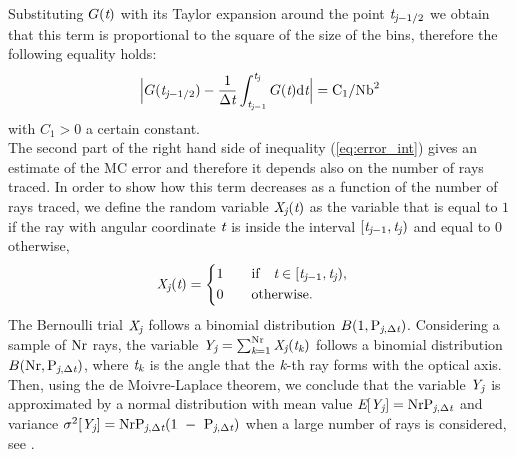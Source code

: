   Substituting $G(\textit{t})$ with its Taylor expansion around the point $\textit{t}_{\textit{j}-1/2}$ we obtain that this term is proportional to the square of the size of the bins, therefore the following equality holds:
\begin{equation}\Big|G(\textit{t}_{\textit{j}-1/2})-\frac{1}{\Delta \textit{t}}\int_{\textit{t}_{\textit{j}-1}}^{\textit{t}_{\textit{j}}} G(\textit{t})\textrm{d}\textit{t}\Big| = \textrm{C}_1/\textrm{Nb}^2\end{equation}
with $C_1>0$ a certain constant. \\
\indent
The second part of the right hand side of inequality (\ref{eq:error_int}) gives an estimate of the MC error and therefore it depends also on the
number of rays traced.
In order to show how this term decreases as a function of the number of rays traced,
we define the random variable $\textit{X}_{\textit{j}}(\textit{t})$ as the variable that is equal to $1$ if the ray with angular coordinate $\textit{t}$
is inside the interval $[\textit{t}_{\textit{j}-1}, \textit{t}_{\textit{j}})$ and equal to $0$ otherwise,
\begin{equation}
\label{radom_variable}
\textit{X}_{\textit{j}}(\textit{t}) = \begin{cases} \begin{aligned}
1& \qquad \mbox{if} \quad \textit{t}\in [\textit{t}_{\textit{j}-1}, \textit{t}_{\textit{j}}),\\
0 & \qquad \mbox{otherwise}.
\end{aligned}\end{cases}
\end{equation}
The Bernoulli trial $ \textit{X}_{\textit{j}}$ follows a binomial distribution $B(1,\textrm{P}_{\textit{j}, \Delta\textit{t}})$.
Considering a sample of $\textrm{Nr}$ rays, the variable $\textit{Y}_{\textit{j}} = \sum_{\textit{k}=1}^{\textrm{Nr}} \textit{X}_{\textit{j}}(\textit{t}_{\textit{k}})$
follows a binomial distribution $B(\textrm{Nr}, \textrm{P}_{\textit{j},\Delta \textit{t}})$, where $\textit{t}_{\textit{k}}$ is the angle that the $\textit{k}$-th ray forms with the optical axis. Then, using the de Moivre-Laplace theorem, we conclude that the variable $\textit{Y}_{\textit{j}}$ is approximated by a normal distribution with mean value $\textit{E}[\textit{Y}_{\textit{j}}] = \textrm{Nr}\textrm{P}_{\textit{j}, \Delta\textit{t}}$ and variance $\sigma^2[\textit{Y}_{\textit{j}}] = \textrm{Nr}\textrm{P}_{\textit{j}, \Delta\textit{t}}(1~-~\textrm{P}_{\textit{j}, \Delta\textit{t}})$ when a large number of rays is considered, see \cite{Rubinstein, deMoivre}.
